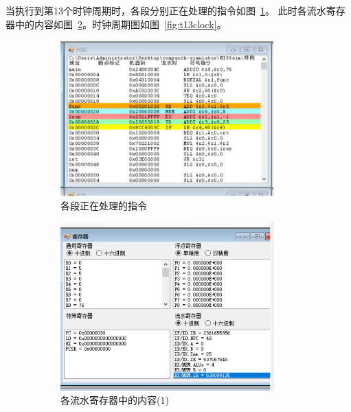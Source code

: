 \documentclass[a4paper,twoside]{article}
\begin{document}
\begin{spacing}{1.2}
当执行到第13个时钟周期时，各段分别正在处理的指令如图~\ref{fig:t13seg}。
此时各流水寄存器中的内容如图~\ref{fig:t13reg}。时钟周期图如图~\ref{fig:t13clock}。
\begin{figure}[htb]
	\centering
	\begin{subfigure}[b]{0.4\textwidth}
		\centering
		\includegraphics[width=0.9\textwidth]{images/t13seg.png}
		\caption{各段正在处理的指令}
		\label{fig:t13seg}
	\end{subfigure}
	\begin{subfigure}[b]{0.4\textwidth}
		\centering
		\includegraphics[width=0.9\textwidth]{images/t13reg1.png}
		\caption{各流水寄存器中的内容(1)}
		\label{fig:t13reg}
	\end{subfigure}
	\begin{subfigure}[b]{0.4\textwidth}
		\centering

\end{subfigure}
\end{figure}
\end{spacing}
\end{document}

